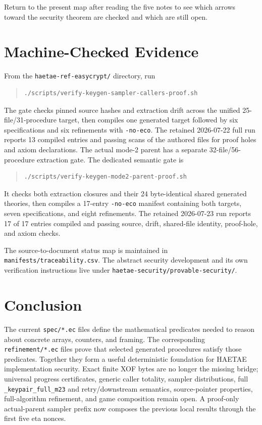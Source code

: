 \documentclass[11pt]{article}
\theoremstyle{definition}
\theoremstyle{plain}
\theoremstyle{remark}
\newcommand{\code}[1]{\nolinkurl{#1}}
\begin{document}
Return to the present map after reading the five notes to see which arrows
toward the security theorem are checked and which are still open.

\section{Machine-Checked Evidence}

From the \code{haetae-ref-easycrypt/} directory, run
\begin{quote}
\begin{verbatim}
./scripts/verify-keygen-sampler-callers-proof.sh
\end{verbatim}
\end{quote}
The gate checks pinned source hashes and extraction drift across the unified
25-file/31-procedure target, then compiles one generated target followed by six
specifications and six refinements with \code{-no-eco}.  The retained
2026-07-22 full run reports 13 compiled entries and passing scans of the
authored files for proof holes and axiom declarations.  The actual mode-2 parent has a separate
32-file/56-procedure extraction gate.  The dedicated semantic gate is
\begin{quote}
\begin{verbatim}
./scripts/verify-keygen-mode2-parent-proof.sh
\end{verbatim}
\end{quote}
It checks both extraction closures and their 24 byte-identical shared
generated theories, then compiles a 17-entry \code{-no-eco} manifest containing
both targets, seven specifications, and eight refinements.  The retained
2026-07-23 run reports 17 of 17 entries compiled and passing source, drift,
shared-file identity, proof-hole, and axiom checks.

The source-to-document status map is maintained in
\code{manifests/traceability.csv}.  The abstract security development and its
own verification instructions live under
\code{haetae-security/provable-security/}.

\section*{Conclusion}

The current \code{spec/*.ec} files define the mathematical predicates needed
to reason about concrete arrays, counters, and framing.  The corresponding
\code{refinement/*.ec} files prove that selected generated procedures satisfy
those predicates.  Together they form a useful deterministic foundation for
HAETAE implementation security.  Exact finite XOF bytes are no longer the
missing bridge; universal progress certificates, generic caller totality,
sampler
distributions, full \code{_keypair_full_m23} and retry/downstream semantics,
source-pointer properties, full-algorithm refinement, and game composition
remain open.  A proof-only actual-parent sampler prefix now composes the
previous local results through the first five eta nonces.
\end{document}
